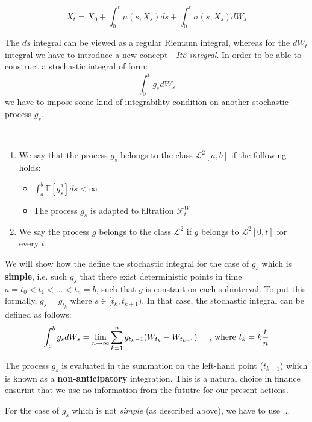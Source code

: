 \documentclass[times, utf8, diplomski]{fer}
\begin{document}
$$ X_t = X_0 + \int_0^t \mu(s,X_s)ds + \int_0^t \sigma(s,X_s)dW_s $$

\noindent The $ds$ integral can be viewed as a regular Riemann integral, whereas for the $dW_t$ integral we have to introduce a new concept - \textit{It\^{o} integral}.
In order to be able to construct a stochastic integral of form:
$$ \int_0^t g_sdW_s$$
\noindent we have to impose some kind of integrability condition on another stochastic process $g_s$.

\begin{definition}~\\
\begin{enumerate}
	\item We say that the process $g_s$ belongs to the class $\mathcal{L}^2[a,b]$ if the following holds:
	\begin{itemize}
		\item $ \int_a^b\mathbb{E}[g_s^2]ds < \infty $
		\item The process $g_s$ is adapted to filtration $\mathcal{F}_t^W$
	\end{itemize}
	\item We say the process $g$ belongs to the class $\mathcal{L}^2$ if $g$ belongs to $\mathcal{L}^2[0,t]$ for every $t$
\end{enumerate}
\end{definition}

\noindent We will show how the define the stochastic integral for the case of $g_s$ which is \textbf{simple}, i.e. such $g_s$ that there exist deterministic points in time $a=t_0 < t_1 < ... < t_n = b$, such that $g$ is constant on each subinterval. To put this formally, $g_s=g_{t_k}$ where $s \in [t_k,t_{k+1})$. In that case, the stochastic integral can be defined as follows:
$$ \int_a^bg_sdW_s = \lim_{n\rightarrow\infty} \sum_{k=1}^n g_{t_k-1}(W_{t_k} - W_{t_{k-1}}) \hspace{0.5cm} \text{, where } t_k = k\frac{t}{n}$$

\noindent The process $g_s$ is evaluated in the summation on the left-hand point ($t_{k-1}$) which is known as a \textbf{non-anticipatory} integration. This is a natural choice in finance ensurint that we use no information from the fututre for our present actions.

\noindent For the case of $g_s$ which is not \textit{simple} (as described above), we have to use ...
\end{document}
